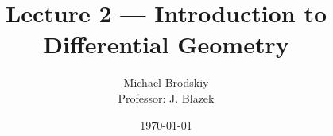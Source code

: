 


\title{Lecture 2 — Introduction to Differential Geometry}
\date{\today}
\author{Michael Brodskiy\\ \small Professor: J. Blazek}



\maketitle

